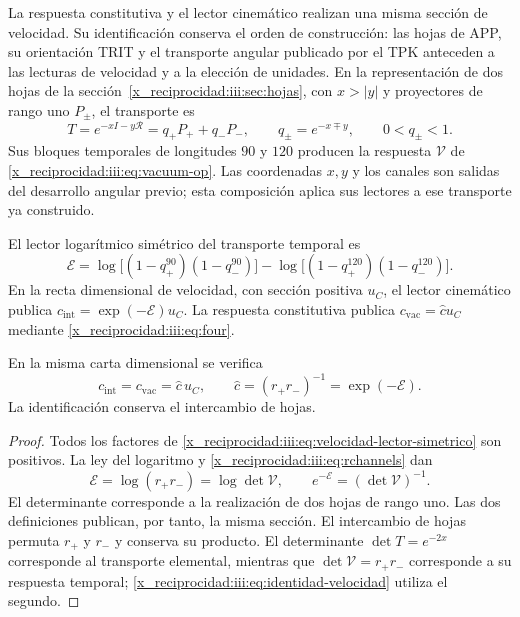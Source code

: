 La respuesta constitutiva y el lector cinemático realizan una misma
sección de velocidad. Su identificación conserva el orden de construcción:
las hojas de APP, su orientación TRIT y el transporte angular publicado
por el TPK anteceden a las lecturas de velocidad y a la elección de unidades.
En la representación de dos hojas de la
sección~\ref{x_reciprocidad:iii:sec:hojas}, con $x>|y|$ y proyectores de rango uno
$P_\pm$, el transporte es
\[
 T=e^{-xI-y\mathcal R}=q_+P_++q_-P_-,
 \qquad q_\pm=e^{-x\mp y},\qquad 0<q_\pm<1.
\]
Sus bloques temporales de longitudes $90$ y $120$ producen la respuesta
$\mathcal V$ de \eqref{x_reciprocidad:iii:eq:vacuum-op}. Las coordenadas $x,y$ y los
canales son salidas del desarrollo angular previo; esta composición
aplica sus lectores a ese transporte ya construido.

El lector logarítmico simétrico del transporte temporal es
\begin{equation}
 \mathcal E=
 \log\!\bigl[(1-q_+^{90})(1-q_-^{90})\bigr]
 -\log\!\bigl[(1-q_+^{120})(1-q_-^{120})\bigr].
 \label{x_reciprocidad:iii:eq:velocidad-lector-simetrico}
\end{equation}
En la recta dimensional de velocidad, con sección positiva $u_C$, el
lector cinemático publica $c_{\mathrm{int}}=\exp(-\mathcal E)u_C$.
La respuesta constitutiva publica
$c_{\mathrm{vac}}=\widehat c u_C$ mediante \eqref{x_reciprocidad:iii:eq:four}.

\begin{proposition}
\label{x_reciprocidad:iii:prop:identidad-velocidad}
En la misma carta dimensional se verifica
\begin{equation}
 c_{\mathrm{int}}=c_{\mathrm{vac}}=\widehat c\,u_C,
 \qquad \widehat c=(r_+r_-)^{-1}=\exp(-\mathcal E).
 \label{x_reciprocidad:iii:eq:identidad-velocidad}
\end{equation}
La identificación conserva el intercambio de hojas.
\end{proposition}
\begin{proof}
Todos los factores de \eqref{x_reciprocidad:iii:eq:velocidad-lector-simetrico} son
positivos. La ley del logaritmo y \eqref{x_reciprocidad:iii:eq:rchannels} dan
\[
 \mathcal E=\log(r_+r_-)=\log\det\mathcal V,
 \qquad e^{-\mathcal E}=(\det\mathcal V)^{-1}.
\]
El determinante corresponde a la realización de dos hojas de rango uno.
Las dos definiciones publican, por tanto, la misma sección. El intercambio
de hojas permuta $r_+$ y $r_-$ y conserva su producto. El determinante
$\det T=e^{-2x}$ corresponde al transporte elemental, mientras que
$\det\mathcal V=r_+r_-$ corresponde a su respuesta temporal;
\eqref{x_reciprocidad:iii:eq:identidad-velocidad} utiliza el segundo.
\end{proof}

